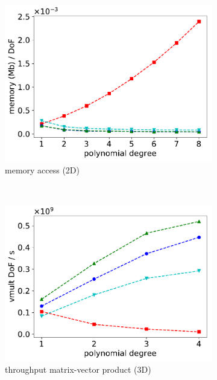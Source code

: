 \documentclass[AMA,STIX1COL]{WileyNJD-v2}
\begin{document}
\begin{figure}
\begin{subfigure}[b]{0.32\textwidth}
      \centering
      \includegraphics[width=\textwidth]{CSL_Munich_memory2d.pdf}
      \caption{memory access (2D)}
      \label{fig:benchmark_miehe_CSL_memory2}
  \end{subfigure}
  ~
  \begin{subfigure}[b]{0.32\textwidth}
    \centering
    \includegraphics[width=\textwidth]{CSL_Munich_throughput3d.pdf}
    \caption{throughput matrix-vector product (3D)}
  \end{subfigure}
  \begin{subfigure}[b]{0.32\textwidth}
    \centering

\end{subfigure}
\end{figure}
\end{document}
